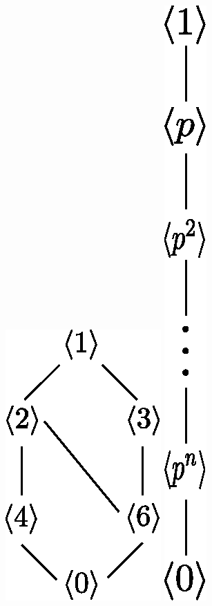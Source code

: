 \begin{example}
\begin{enumerate}
\begin{figure}[h]
                \includegraphics[scale = 0.5]{Figures/Chapter2/Z_12_lattice.eps}
                \includegraphics[scale = 0.5]{Figures/Chapter2/Z_p^n_lattice.eps}

\end{figure}
\end{enumerate}
\end{example}
